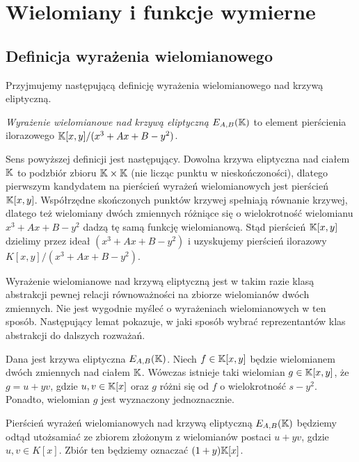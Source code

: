 \section{Wielomiany i funkcje wymierne}

\subsection*{Definicja wyrażenia wielomianowego}

Przyjmujemy następującą definicję
wyrażenia wielomianowego nad krzywą eliptyczną.

\begin{definition}
\emph{Wyrażenie wielomianowe nad krzywą eliptyczną $E_{A,B}(\mathbb{K})$}
to element pierścienia ilorazowego
$\mathbb{K}[x,y]/(x^3 + Ax + B - y^2)$.
\end{definition}

Sens powyższej definicji jest następujący.
Dowolna krzywa eliptyczna nad ciałem $\mathbb{K}$ to podzbiór zbioru $\mathbb{K} \times \mathbb{K}$
(nie licząc punktu w nieskończoności),
dlatego pierwszym kandydatem na pierścień wyrażeń wielomianowych
jest pierścień $\mathbb{K}[x,y]$.
Współrzędne skończonych punktów krzywej spełniają równanie krzywej,
dlatego też wielomiany dwóch zmiennych różniące się
o wielokrotność wielomianu $x^3 + Ax + B - y^2$
dadzą tę samą funkcję wielomianową.
Stąd pierścień $\mathbb{K}[x,y]$ dzielimy przez ideał $(x^3 + Ax + B - y^2)$
i uzyskujemy pierścień ilorazowy $K[x,y]/(x^3 + Ax + B - y^2)$.

Wyrażenie wielomianowe nad krzywą eliptyczną
jest w takim razie klasą abstrakcji
pewnej relacji równoważności na zbiorze wielomianów dwóch zmiennych.
Nie jest wygodnie myśleć o wyrażeniach wielomianowych w ten sposób.
Następujący lemat pokazuje,
w jaki sposób wybrać reprezentantów klas abstrakcji
do dalszych rozważań.

\begin{lemma}
Dana jest krzywa eliptyczna $E_{A,B}(\mathbb{K})$.
Niech $f \in \mathbb{K}[x,y]$
będzie wielomianem dwóch zmiennych nad ciałem $\mathbb{K}$.
Wówczas istnieje taki wielomian $g \in \mathbb{K}[x,y]$,
że $g = u + yv$, gdzie $u, v \in \mathbb{K}[x]$
oraz $g$ różni się od $f$ o wielokrotność $s - y^2$.
Ponadto, wielomian $g$ jest wyznaczony jednoznacznie.
\end{lemma}

\begin{remark}
Pierścień wyrażeń wielomianowych nad krzywą eliptyczną $E_{A,B}(\mathbb{K})$
będziemy odtąd utożsamiać ze zbiorem
złożonym z wielomianów postaci $u + yv$,
gdzie $u, v \in K[x]$.
Zbiór ten będziemy oznaczać $(1 + y)\mathbb{K}[x]$.
\end{remark}

